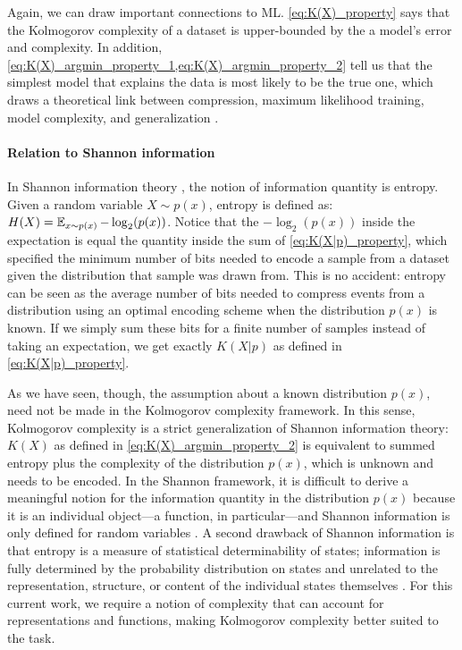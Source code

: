 \documentclass{article}
\begin{document}
\begin{appendices}
Again, we can draw important connections to ML. \cref{eq:K(X)_property} says that the Kolmogorov complexity of a dataset is upper-bounded by the a model's error and complexity. In addition, \cref{eq:K(X)_argmin_property_1,eq:K(X)_argmin_property_2} tell us that the simplest model that explains the data is most likely to be the true one, which draws a theoretical link between compression, maximum likelihood training, model complexity, and generalization \citep{goldblum2023no}.

\paragraph{Relation to Shannon information}

In Shannon information theory \citep{shannon2001mathematical}, the notion of information quantity is entropy. Given a random variable $X \sim p(x)$, entropy is defined as: $H(X) = \operatorname*{\mathbb{E}}_{x \sim p(x)} -\log_2(p(x))$. Notice that the $-\log_2(p(x))$ inside the expectation is equal the quantity inside the sum of \cref{eq:K(X|p)_property}, which specified the minimum number of bits needed to encode a sample from a dataset given the distribution that sample was drawn from. This is no accident: entropy can be seen as the average number of bits needed to compress events from a distribution using an optimal encoding scheme when the distribution $p(x)$ is known. If we simply sum these bits for a finite number of samples instead of taking an expectation, we get exactly $K(X|p)$ as defined in \cref{eq:K(X|p)_property}.

As we have seen, though, the assumption about a known distribution $p(x)$, need not be made in the Kolmogorov complexity framework. In this sense, Kolmogorov complexity is a strict generalization of Shannon information theory: $K(X)$ as defined in \cref{eq:K(X)_argmin_property_2} is equivalent to summed entropy plus the complexity of the distribution $p(x)$, which is unknown and needs to be encoded. In the Shannon framework, it is difficult to derive a meaningful notion for the information quantity in the distribution $p(x)$ because it is an individual object---a function, in particular---and Shannon information is only defined for random variables \citep{grunwald2003kolmogorov}. A second drawback of Shannon information is that entropy is a measure of statistical determinability of states; information is fully determined by the probability distribution on states and unrelated to the representation, structure, or content of the individual states themselves \citep{grunwald2003kolmogorov}. For this current work, we require a notion of complexity that can account for representations and functions, making Kolmogorov complexity better suited to the task.



\end{appendices}
\end{document}
